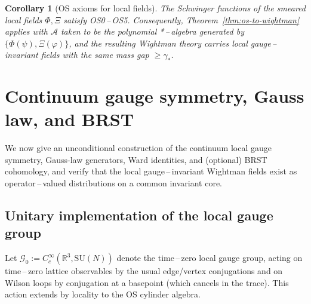 \documentclass[11pt]{amsart}
\theoremstyle{plain}
\newtheorem{corollary}[theorem]{Corollary}
\theoremstyle{definition}
\theoremstyle{remark}
\begin{document}
\begin{corollary}[OS axioms for local fields]
\label{cor:os-local-fields}
The Schwinger functions of the smeared local fields $\Phi,\Xi$ satisfy OS0\,--\,OS5. Consequently, Theorem~\ref{thm:os-to-wightman} applies with $\mathcal A$ taken to be the polynomial *\,--\,algebra generated by $\{\Phi(\psi),\Xi(\varphi)\}$, and the resulting Wightman theory carries local gauge\,--\,invariant fields with the same mass gap $\ge \gamma_*$.
\end{corollary}

\section{Continuum gauge symmetry, Gauss law, and BRST}
\label{sec:gauge-brst}

We now give an unconditional construction of the continuum local gauge symmetry, Gauss-law generators, Ward identities, and (optional) BRST cohomology, and verify that the local gauge\,--\,invariant Wightman fields exist as operator\,--\,valued distributions on a common invariant core.

\subsection{Unitary implementation of the local gauge group}

Let $\mathcal G_0:=C_c^\infty(\mathbb R^3,\mathrm{SU}(N))$ denote the time\,–\,zero local gauge group, acting on time\,–\,zero lattice observables by the usual edge/vertex conjugations and on Wilson loops by conjugation at a basepoint (which cancels in the trace). This action extends by locality to the OS cylinder algebra.
\end{document}
